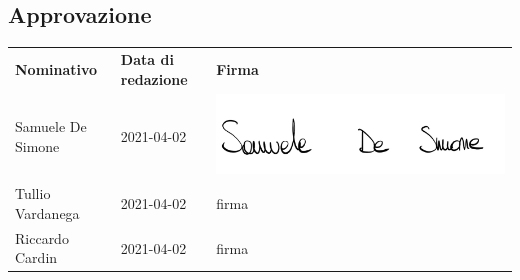     \subsection{Approvazione}
        \begin{center}
            \begin{table}[h!]
                \centering
                \renewcommand{\arraystretch}{1.8}
                \begin{tabular}{p{150px} p{110px} p{110px}}
                    \rowcolor{logo!70} \textbf{Nominativo} & \textbf{Data di redazione} & \textbf{Firma}\\
                    Samuele De Simone & 2021-04-02 & \includegraphics[scale=0.06]{../../../Images/firme/firmaSamueleDeSimone.png} \\
                    Tullio Vardanega & 2021-04-02 & firma \\
                    Riccardo Cardin & 2021-04-02 & firma \\
                \end{tabular}
            \end{table}
        \end{center}
        \pagebreak
